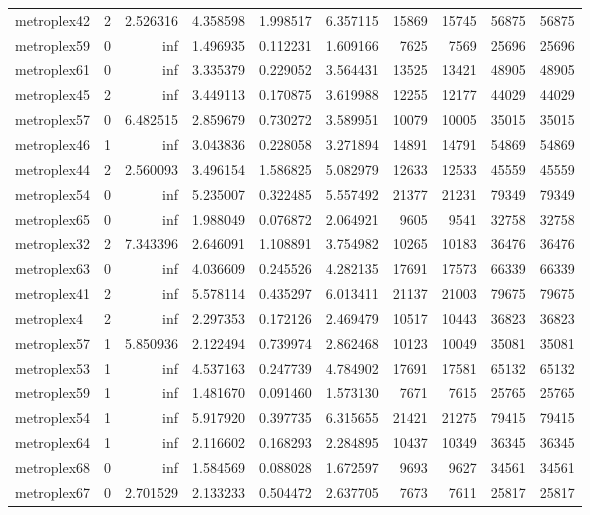 \begin{longtable}{|l|r|r|r|r|r|r|r|r|r|}
metroplex42 & 2 & 2.526316 & 4.358598 & 1.998517 & 6.357115 & 15869 & 15745 & 56875 & 56875 \\
metroplex59 & 0 & inf & 1.496935 & 0.112231 & 1.609166 & 7625 & 7569 & 25696 & 25696 \\
metroplex61 & 0 & inf & 3.335379 & 0.229052 & 3.564431 & 13525 & 13421 & 48905 & 48905 \\
metroplex45 & 2 & inf & 3.449113 & 0.170875 & 3.619988 & 12255 & 12177 & 44029 & 44029 \\
metroplex57 & 0 & 6.482515 & 2.859679 & 0.730272 & 3.589951 & 10079 & 10005 & 35015 & 35015 \\
metroplex46 & 1 & inf & 3.043836 & 0.228058 & 3.271894 & 14891 & 14791 & 54869 & 54869 \\
metroplex44 & 2 & 2.560093 & 3.496154 & 1.586825 & 5.082979 & 12633 & 12533 & 45559 & 45559 \\
metroplex54 & 0 & inf & 5.235007 & 0.322485 & 5.557492 & 21377 & 21231 & 79349 & 79349 \\
metroplex65 & 0 & inf & 1.988049 & 0.076872 & 2.064921 & 9605 & 9541 & 32758 & 32758 \\
metroplex32 & 2 & 7.343396 & 2.646091 & 1.108891 & 3.754982 & 10265 & 10183 & 36476 & 36476 \\
metroplex63 & 0 & inf & 4.036609 & 0.245526 & 4.282135 & 17691 & 17573 & 66339 & 66339 \\
metroplex41 & 2 & inf & 5.578114 & 0.435297 & 6.013411 & 21137 & 21003 & 79675 & 79675 \\
metroplex4 & 2 & inf & 2.297353 & 0.172126 & 2.469479 & 10517 & 10443 & 36823 & 36823 \\
metroplex57 & 1 & 5.850936 & 2.122494 & 0.739974 & 2.862468 & 10123 & 10049 & 35081 & 35081 \\
metroplex53 & 1 & inf & 4.537163 & 0.247739 & 4.784902 & 17691 & 17581 & 65132 & 65132 \\
metroplex59 & 1 & inf & 1.481670 & 0.091460 & 1.573130 & 7671 & 7615 & 25765 & 25765 \\
metroplex54 & 1 & inf & 5.917920 & 0.397735 & 6.315655 & 21421 & 21275 & 79415 & 79415 \\
metroplex64 & 1 & inf & 2.116602 & 0.168293 & 2.284895 & 10437 & 10349 & 36345 & 36345 \\
metroplex68 & 0 & inf & 1.584569 & 0.088028 & 1.672597 & 9693 & 9627 & 34561 & 34561 \\
metroplex67 & 0 & 2.701529 & 2.133233 & 0.504472 & 2.637705 & 7673 & 7611 & 25817 & 25817 \\

\end{longtable}

